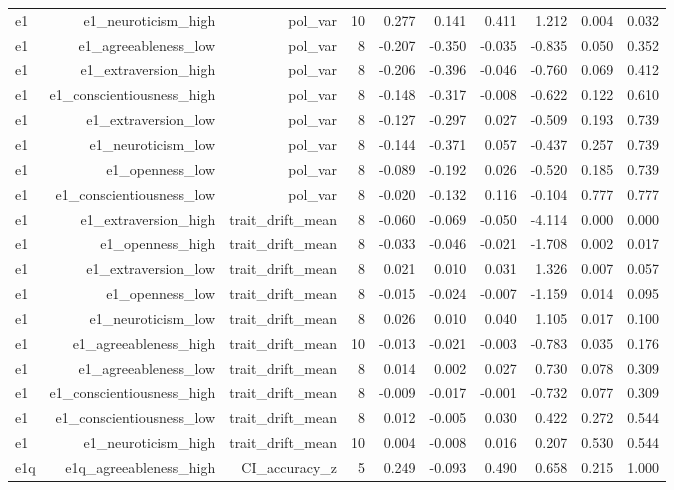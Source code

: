 \documentclass[11pt]{article}
\begin{document}
\begin{landscape}
\begin{longtable}{@{}lrrrrrrrrr@{}}
e1 & e1\_neuroticism\_high & pol\_var & 10 & 0.277 & 0.141 & 0.411 & 1.212 & 0.004 & 0.032 \\
e1 & e1\_agreeableness\_low & pol\_var & 8 & -0.207 & -0.350 & -0.035 & -0.835 & 0.050 & 0.352 \\
e1 & e1\_extraversion\_high & pol\_var & 8 & -0.206 & -0.396 & -0.046 & -0.760 & 0.069 & 0.412 \\
e1 & e1\_conscientiousness\_high & pol\_var & 8 & -0.148 & -0.317 & -0.008 & -0.622 & 0.122 & 0.610 \\
e1 & e1\_extraversion\_low & pol\_var & 8 & -0.127 & -0.297 & 0.027 & -0.509 & 0.193 & 0.739 \\
e1 & e1\_neuroticism\_low & pol\_var & 8 & -0.144 & -0.371 & 0.057 & -0.437 & 0.257 & 0.739 \\
e1 & e1\_openness\_low & pol\_var & 8 & -0.089 & -0.192 & 0.026 & -0.520 & 0.185 & 0.739 \\
e1 & e1\_conscientiousness\_low & pol\_var & 8 & -0.020 & -0.132 & 0.116 & -0.104 & 0.777 & 0.777 \\
e1 & e1\_extraversion\_high & trait\_drift\_mean & 8 & -0.060 & -0.069 & -0.050 & -4.114 & 0.000 & 0.000 \\
e1 & e1\_openness\_high & trait\_drift\_mean & 8 & -0.033 & -0.046 & -0.021 & -1.708 & 0.002 & 0.017 \\
e1 & e1\_extraversion\_low & trait\_drift\_mean & 8 & 0.021 & 0.010 & 0.031 & 1.326 & 0.007 & 0.057 \\
e1 & e1\_openness\_low & trait\_drift\_mean & 8 & -0.015 & -0.024 & -0.007 & -1.159 & 0.014 & 0.095 \\
e1 & e1\_neuroticism\_low & trait\_drift\_mean & 8 & 0.026 & 0.010 & 0.040 & 1.105 & 0.017 & 0.100 \\
e1 & e1\_agreeableness\_high & trait\_drift\_mean & 10 & -0.013 & -0.021 & -0.003 & -0.783 & 0.035 & 0.176 \\
e1 & e1\_agreeableness\_low & trait\_drift\_mean & 8 & 0.014 & 0.002 & 0.027 & 0.730 & 0.078 & 0.309 \\
e1 & e1\_conscientiousness\_high & trait\_drift\_mean & 8 & -0.009 & -0.017 & -0.001 & -0.732 & 0.077 & 0.309 \\
e1 & e1\_conscientiousness\_low & trait\_drift\_mean & 8 & 0.012 & -0.005 & 0.030 & 0.422 & 0.272 & 0.544 \\
e1 & e1\_neuroticism\_high & trait\_drift\_mean & 10 & 0.004 & -0.008 & 0.016 & 0.207 & 0.530 & 0.544 \\
e1q & e1q\_agreeableness\_high & CI\_accuracy\_z & 5 & 0.249 & -0.093 & 0.490 & 0.658 & 0.215 & 1.000 \\

\end{longtable}
\end{landscape}
\end{document}
